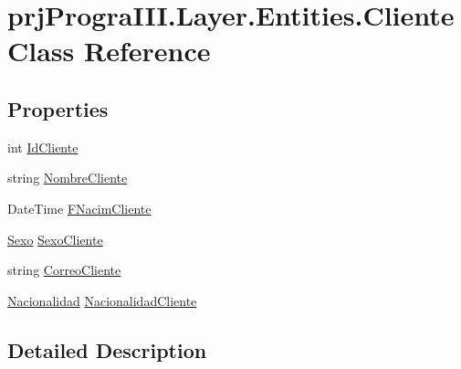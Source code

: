 \hypertarget{classprj_progra_i_i_i_1_1_layer_1_1_entities_1_1_cliente}{}\section{prj\+Progra\+I\+I\+I.\+Layer.\+Entities.\+Cliente Class Reference}
\label{classprj_progra_i_i_i_1_1_layer_1_1_entities_1_1_cliente}
\subsection*{Properties}
\begin{DoxyCompactItemize}
\item 
int \hyperlink{classprj_progra_i_i_i_1_1_layer_1_1_entities_1_1_cliente_ae8cca6a3b84d4adfb23778d72cc6797f}{Id\+Cliente}
\item 
string \hyperlink{classprj_progra_i_i_i_1_1_layer_1_1_entities_1_1_cliente_a4f1af902b5c286d6fd1105c6dd9e3836}{Nombre\+Cliente}
\item 
Date\+Time \hyperlink{classprj_progra_i_i_i_1_1_layer_1_1_entities_1_1_cliente_abb6f2a39ce192a1f7cf70d22e2359df1}{F\+Nacim\+Cliente}
\item 
\hyperlink{_sexo_8cs_a8527e06e0495c9639a8cc66fa99d42ad}{Sexo} \hyperlink{classprj_progra_i_i_i_1_1_layer_1_1_entities_1_1_cliente_af63caa8fe49fcd05b2ddc2aa01d37a1c}{Sexo\+Cliente}
\item 
string \hyperlink{classprj_progra_i_i_i_1_1_layer_1_1_entities_1_1_cliente_ae3703f25e34656ce16a0fcf2070b4553}{Correo\+Cliente}
\item 
\hyperlink{classprj_progra_i_i_i_1_1_layer_1_1_entities_1_1_nacionalidad}{Nacionalidad} \hyperlink{classprj_progra_i_i_i_1_1_layer_1_1_entities_1_1_cliente_a344360f96a769c3e003ebdceb382bd61}{Nacionalidad\+Cliente}
\end{DoxyCompactItemize}


\subsection{Detailed Description}


